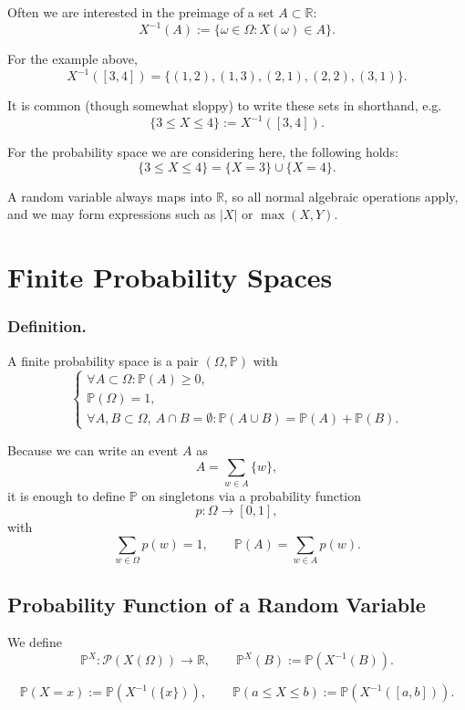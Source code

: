 \documentclass{article}
\begin{document}
Often we are interested in the preimage of a set $A \subset \mathbb{R}$:
\[
X^{-1}(A) := \{ \omega \in \Omega : X(\omega) \in A \}.
\]

For the example above,
\[
X^{-1}([3,4])
= \{ (1,2), (1,3), (2,1), (2,2), (3,1) \}.
\]

It is common (though somewhat sloppy) to write these sets in shorthand, e.g.
\[
\{3 \le X \le 4\} := X^{-1}([3,4]).
\]

For the probability space we are considering here, the following holds:
\[
\{3 \le X \le 4\} = \{X = 3\} \cup \{X = 4\}.
\]

A random variable always maps into $\mathbb{R}$, so all normal algebraic 
operations apply, and we may form expressions such as $|X|$ or $\max(X,Y)$.

\section{Finite Probability Spaces}

\subsubsection{Definition.}
A finite probability space is a pair $(\Omega,\mathbb{P})$ with
\[
\begin{cases}
  \forall A \subset \Omega : \mathbb{P}(A) \ge 0,\\[2mm]
  \mathbb{P}(\Omega) = 1,\\[2mm]
  \forall A,B \subset \Omega,\ A \cap B = \emptyset :
  \mathbb{P}(A \cup B) = \mathbb{P}(A) + \mathbb{P}(B).
\end{cases}
\]

Because we can write an event $A$ as
\[
A = \sum_{w\in A}\{w\},
\]
it is enough to define $\mathbb{P}$ on singletons via a probability function
\[
p : \Omega \to [0,1],
\]
with
\[
\sum_{w\in \Omega} p(w) = 1,
\qquad
\mathbb{P}(A) = \sum_{w\in A} p(w).
\]

\subsection{Probability Function of a Random Variable}

We define
\[
\mathbb{P}^X : \mathcal{P}(X(\Omega)) \to \mathbb{R},
\qquad
\mathbb{P}^X(B) := \mathbb{P}(X^{-1}(B)).
\]

\[
\mathbb{P}(X = x) := \mathbb{P}(X^{-1}(\{x\})),
\qquad
\mathbb{P}(a \le X \le b) := \mathbb{P}(X^{-1}([a,b])).
\]
\end{document}
